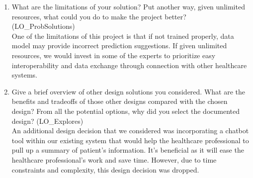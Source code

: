 \documentclass[12pt, titlepage]{article}
\begin{document}
\begin{enumerate}
  \item What are the limitations of your solution?  Put another way, given unlimited resources, what could you do to make the project better? (LO\_ProbSolutions)\\
  One of the limitations of this project is that if not trained properly, data model may provide incorrect prediction suggestions. If given unlimited resources, we would invest in some of the experts to prioritize easy interoperability and data exchange through connection with other healthcare systems. 

  \item Give a brief overview of other design solutions you considered.  What are the benefits and tradeoffs of those other designs compared with the chosen design?  From all the potential options, why did you select the documented design? (LO\_Explores)\\
  An additional design decision that we considered was incorporating a chatbot tool within our existing system that would help the healthcare professional to pull up a summary of patient's information. It's beneficial as it will ease the healthcare professional's work and save time. However, due to time constraints and complexity, this design decision was dropped.  

\end{enumerate}
\end{document}
